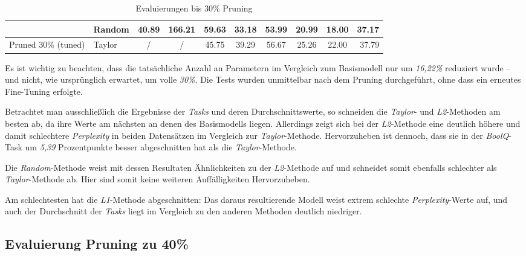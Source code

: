 \begin{table}[h]
{\begin{tabular}{l l | c c | c c c c c | r}
			                             & Random          & 40.89              & 166.21
			                             & 59.63           & 33.18              & 53.99
			                             & 20.99           & 18.00              & 37.17              \\
			\midrule
			Pruned 30\% (tuned)          & Taylor          & /                  & /
			                             & 45.75           & 39.29              & 56.67
			                             & 25.26           & 22.00              & 37.79              \\
			\bottomrule
			\bottomrule
		\end{tabular}}
	\caption{Evaluierungen bis 30\% Pruning}
	\label{tab:pruning30}
\end{table}

Es ist wichtig zu beachten, dass die tatsächliche Anzahl an Parametern im
Vergleich zum Basismodell nur um \emph{16,22\%} reduziert wurde – und nicht, wie
ursprünglich erwartet, um volle \emph{30\%}. Die Tests wurden unmittelbar nach
dem Pruning durchgeführt, ohne dass ein erneutes Fine-Tuning erfolgte.

Betrachtet man ausschließlich die Ergebnisse der \emph{Tasks} und deren
Durchschnittswerte, so schneiden die \emph{Taylor}- und \emph{L2}-Methoden am
besten ab, da ihre Werte am nächsten an denen des Basismodells liegen.
Allerdings zeigt sich bei der \emph{L2}-Methode eine deutlich höhere und damit
schlechtere \emph{Perplexity} in beiden Datensätzen im Vergleich zur
\emph{Taylor}-Methode. Hervorzuheben ist dennoch, dass sie in der
\emph{BoolQ}-Task um \emph{5,39} Prozentpunkte besser abgeschnitten hat als die
\emph{Taylor}-Methode.

Die \emph{Random}-Methode weist mit dessen Resultaten Ähnlichkeiten zu der
\emph{L2}-Methode auf und schneidet somit ebenfalls schlechter als
\emph{Taylor}-Methode ab. Hier sind somit keine weiteren Auffälligkeiten
Hervorzuheben.

Am schlechtesten hat die \emph{L1}-Methode abgeschnitten: Das daraus
resultierende Modell weist extrem schlechte \emph{Perplexity}-Werte auf, und
auch der Durchschnitt der \emph{Tasks} liegt im Vergleich zu den anderen
Methoden deutlich niedriger.

\newpage

\subsection{Evaluierung Pruning zu 40\%}

